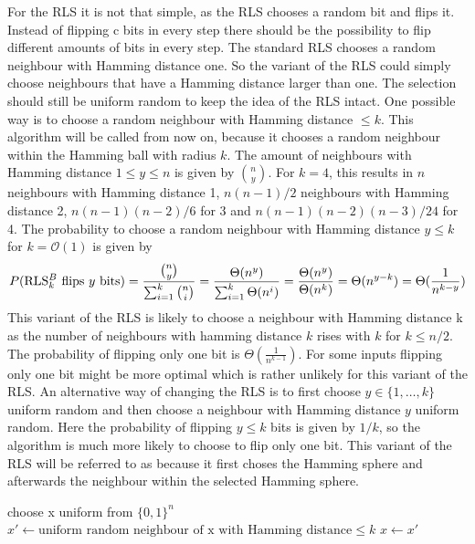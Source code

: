 For the RLS it is not that simple, as the RLS chooses a random bit and flips it.
Instead of flipping c bits in every step there should be the possibility to flip different amounts of bits in every step.
The standard RLS chooses a random neighbour with Hamming distance one.
So the variant of the RLS could simply choose neighbours that have a Hamming distance larger than one.
The selection should still be uniform random to keep the idea of the RLS intact.
One possible way is to choose a random neighbour with Hamming distance $\le k$.
This algorithm will be called \RLSN[k] from now on, because it chooses a random neighbour within the Hamming ball with radius $k$.
The amount of neighbours with Hamming distance $1\le y\le n$ is given by $\binom{n}{y}$.
For $k=4$, this results in $n$ neighbours with Hamming distance 1, $n(n-1)/2$ neighbours with Hamming distance 2, $n(n-1)(n-2)/6$ for 3
and $n(n-1)(n-2)(n-3)/24$ for 4.
The probability to choose a random neighbour with Hamming distance $y \le k$ for $k = \mathcal{O}(1)$ is given by
\[P(\text{RLS$^{B}_{k}$}\text{ flips }y\text{ bits}) = \frac{\binom{n}{y}}{\sum_{i=1}^k \binom{n}{i}} = \frac{\Theta(n^y)}{\sum_{i=1}^k \Theta(n^i)}
      = \frac{\Theta(n^y)}{\Theta(n^k)} = \Theta(n^{y-k}) = \Theta(\frac{1}{n^{k-y}})\]
This variant of the RLS is likely to choose a neighbour with Hamming distance k as the number of neighbours with hamming
distance $k$ rises with $k$ for $k \le n/2$.
The probability of flipping only one bit is $\Theta(\frac{1}{n^{k-1}})$.
For some inputs flipping only one bit might be more optimal which is rather unlikely for this variant of the RLS.\newline
An alternative way of changing the RLS is to first choose $y \in \{1, \dots, k\}$ uniform random and then choose a neighbour with Hamming distance $y$ uniform random.
Here the probability of flipping $y \le k$ bits is given by $1/k$, so the algorithm is much more likely to choose to flip only one bit.
This variant of the RLS will be referred to as \RLSR[k] because it first choses the Hamming sphere and afterwards the neighbour within the selected Hamming sphere.

\begin{algorithm}[b]
      \caption{\textsc{\RLSN}}\label{alg:rlsN}

      \DontPrintSemicolon %

      \BlankLine
      choose x uniform from ${\{0,1\}}^n$\;
      {
      $x' \leftarrow \text{uniform random neighbour of x with Hamming distance} \le k$\;
      {
      {
            $x \leftarrow x'$\;
      }
      }
      }
\end{algorithm}


